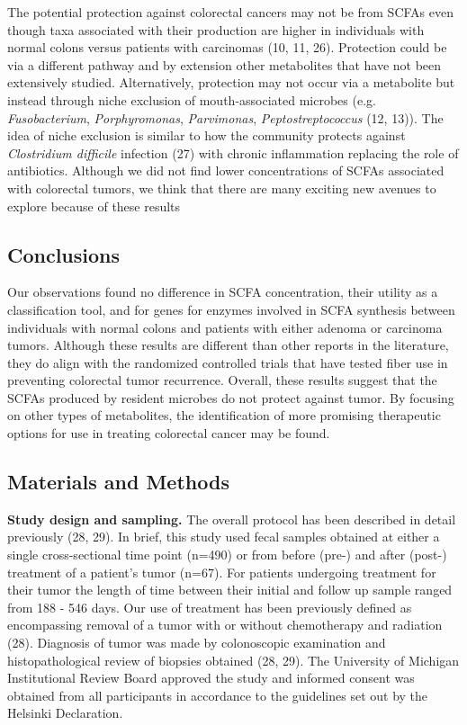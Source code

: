 \documentclass[11pt,]{article}
\begin{document}
The potential protection against colorectal cancers may not be from
SCFAs even though taxa associated with their production are higher in
individuals with normal colons versus patients with carcinomas (10, 11,
26). Protection could be via a different pathway and by extension other
metabolites that have not been extensively studied. Alternatively,
protection may not occur via a metabolite but instead through niche
exclusion of mouth-associated microbes (e.g. \emph{Fusobacterium},
\emph{Porphyromonas}, \emph{Parvimonas}, \emph{Peptostreptococcus} (12,
13)). The idea of niche exclusion is similar to how the community
protects against \emph{Clostridium difficile} infection (27) with
chronic inflammation replacing the role of antibiotics. Although we did
not find lower concentrations of SCFAs associated with colorectal
tumors, we think that there are many exciting new avenues to explore
because of these results

\newpage

\subsection{Conclusions}\label{conclusions}

Our observations found no difference in SCFA concentration, their
utility as a classification tool, and for genes for enzymes involved in
SCFA synthesis between individuals with normal colons and patients with
either adenoma or carcinoma tumors. Although these results are different
than other reports in the literature, they do align with the randomized
controlled trials that have tested fiber use in preventing colorectal
tumor recurrence. Overall, these results suggest that the SCFAs produced
by resident microbes do not protect against tumor. By focusing on other
types of metabolites, the identification of more promising therapeutic
options for use in treating colorectal cancer may be found.

\newpage

\subsection{Materials and Methods}\label{materials-and-methods}

\textbf{Study design and sampling.} The overall protocol has been
described in detail previously (28, 29). In brief, this study used fecal
samples obtained at either a single cross-sectional time point (n=490)
or from before (pre-) and after (post-) treatment of a patient's tumor
(n=67). For patients undergoing treatment for their tumor the length of
time between their initial and follow up sample ranged from 188 - 546
days. Our use of treatment has been previously defined as encompassing
removal of a tumor with or without chemotherapy and radiation (28).
Diagnosis of tumor was made by colonoscopic examination and
histopathological review of biopsies obtained (28, 29). The University
of Michigan Institutional Review Board approved the study and informed
consent was obtained from all participants in accordance to the
guidelines set out by the Helsinki Declaration.
\end{document}
